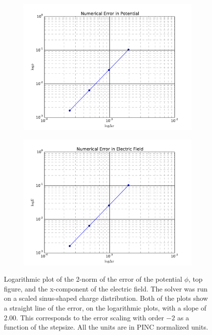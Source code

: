 \begin{figure}
    \centering
    \begin{subfigure}[b]{\textwidth}
        \includegraphics[width = \textwidth]{figures/verification/errorScaling/errorloglogPotential}
    \end{subfigure}
	\begin{subfigure}[b]{\textwidth}
		\includegraphics[width = \textwidth]{figures/verification/errorScaling/errorloglogE}
	\end{subfigure}
    \caption{Logarithmic plot of the 2-norm of the error of the potential \(\phi\), top figure, and the
    x-component of the electric field. The solver was run on a scaled sinus-shaped charge distribution.
    Both of the plots show a straight line of the error, on the logarithmic plots, with a slope
    of \(2.00\). This corresponds to the error scaling with order \(-2\) as a function of the
	stepsize. All the units are in PINC normalized units.}
    \label{fig:errorScaling}
\end{figure}
